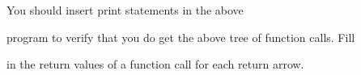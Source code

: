You should insert print statements in the above

program to verify that you do get the above tree of function calls. Fill

in the return values of a function call for each return arrow.

